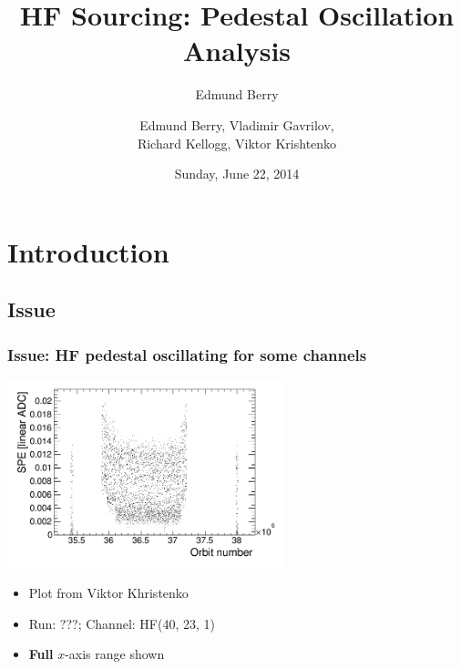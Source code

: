 \documentclass[bigger]{beamer}
\title{HF Sourcing: Pedestal Oscillation Analysis}
\author{Edmund Berry}
\date{Sunday, June 22, 2014}
\author[Edmund Berry]{\alert{Edmund Berry}, Vladimir Gavrilov, \\ Richard Kellogg, Viktor Krishtenko}
\providecommand{\alert}[1]{\textbf{#1}}
\begin{document}
\maketitle


\section{Introduction}
\label{sec-1}
\subsection{Issue}
\label{sec-1-1}
\begin{frame}
\frametitle{Issue: HF pedestal oscillating for some channels}
\label{sec-1-1-1}
\label{sec-1-1-1-1}

\centering
\includegraphics[width=0.6\textwidth]{fig/SPE_vs_ORN_unzoomed.png}
\begin{itemize}

\item Plot from Viktor Khristenko
\label{sec-1-1-1-2}%

\item Run: ???; Channel: HF(40, 23, 1)
\label{sec-1-1-1-3}%

\item \alert{Full} $x$-axis range shown
\label{sec-1-1-1-4}%
\end{itemize} %
\end{frame}
\end{document}
